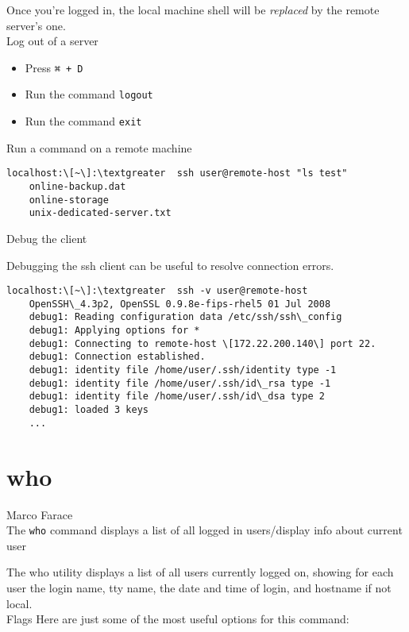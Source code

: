 \documentclass[hidelinks,12pt,a4paper,numbers=enddot]{scrartcl}
\begin{document}
Once you're logged in, the local machine shell will be
\emph{replaced} by the remote server's one.\\

Log out of a server

\begin{itemize}
    \item Press \texttt{⌘ + D}
    \item Run the command \texttt{logout}
    \item Run the command \texttt{exit}
\end{itemize}

Run a command on a remote machine

\begin{verbatim}
localhost:\[~\]:\textgreater  ssh user@remote-host "ls test"
    online-backup.dat
    online-storage
    unix-dedicated-server.txt
\end{verbatim}


Debug the client

Debugging the ssh client can be useful to resolve connection errors.

\begin{verbatim}
localhost:\[~\]:\textgreater  ssh -v user@remote-host
    OpenSSH\_4.3p2, OpenSSL 0.9.8e-fips-rhel5 01 Jul 2008
    debug1: Reading configuration data /etc/ssh/ssh\_config
    debug1: Applying options for *
    debug1: Connecting to remote-host \[172.22.200.140\] port 22.
    debug1: Connection established.
    debug1: identity file /home/user/.ssh/identity type -1
    debug1: identity file /home/user/.ssh/id\_rsa type -1
    debug1: identity file /home/user/.ssh/id\_dsa type 2
    debug1: loaded 3 keys
    ...
\end{verbatim}

\section{who}


\large Marco Farace \normalsize\\


The \texttt{who} command displays a list of all logged in users/display info
about current user

The who utility displays a list of all users currently logged on, showing
for each user the login name, tty name, the date and time of login, and
hostname if not local.\\

Flags
Here are just some of the most useful options for this command:
\end{document}
